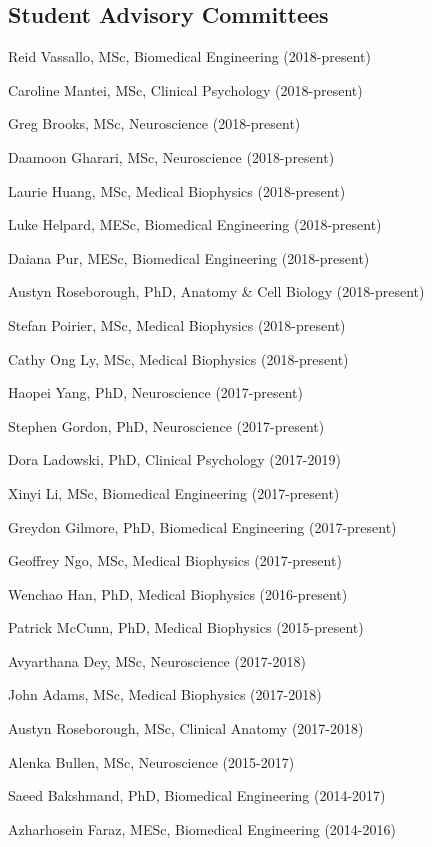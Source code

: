 
\subsection*{Student Advisory Committees}

\begin{packed_enum}
\item Reid Vassallo, MSc, Biomedical Engineering (2018-present)
\item Caroline Mantei, MSc, Clinical Psychology (2018-present)
\item Greg Brooks, MSc, Neuroscience (2018-present)
\item Daamoon Gharari, MSc, Neuroscience (2018-present)
\item Laurie Huang, MSc, Medical Biophysics (2018-present)
\item Luke Helpard, MESc, Biomedical Engineering (2018-present)
\item Daiana Pur, MESc, Biomedical Engineering (2018-present)
\item Austyn Roseborough, PhD, Anatomy \& Cell Biology (2018-present)
\item Stefan Poirier, MSc, Medical Biophysics (2018-present)
\item Cathy Ong Ly, MSc, Medical Biophysics (2018-present)
\item Haopei Yang, PhD, Neuroscience (2017-present)
\item Stephen Gordon, PhD, Neuroscience (2017-present)
\item Dora Ladowski, PhD, Clinical Psychology (2017-2019)
\item Xinyi Li, MSc, Biomedical Engineering (2017-present)
\item Greydon Gilmore, PhD, Biomedical Engineering (2017-present)
\item Geoffrey Ngo, MSc, Medical Biophysics (2017-present)
\item Wenchao Han, PhD, Medical Biophysics (2016-present)
\item Patrick McCunn, PhD, Medical Biophysics (2015-present)
\item Avyarthana Dey, MSc, Neuroscience (2017-2018)
\item John Adams, MSc, Medical Biophysics (2017-2018)
\item Austyn Roseborough, MSc, Clinical Anatomy (2017-2018)
\item Alenka Bullen, MSc, Neuroscience (2015-2017)
\item Saeed Bakshmand, PhD, Biomedical Engineering (2014-2017)
\item Azharhosein Faraz, MESc, Biomedical Engineering (2014-2016)
\end{packed_enum}


